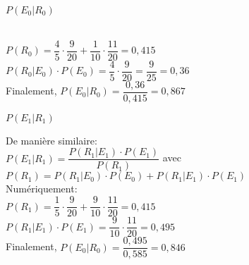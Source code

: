 \begin{exo}
\begin{subexo}{$P(E_0 | R_0)$}
\begin{flushleft}
      \\$P(R_0) = \dfrac{4}{5}\cdot\dfrac{9}{20} +\dfrac{1}{10}\cdot\dfrac{11}{20} = 0,415$
      \\$P(R_0|E_0)\cdot P(E_0) =  \dfrac{4}{5}\cdot \dfrac{9}{20} = \dfrac{9}{25} = 0,36$
      \\ Finalement, $P(E_0|R_0) = \dfrac{0,36}{0,415} = 0,867$
    \end{flushleft}
  \end{subexo}
  \begin{subexo}{$P(E_1 | R_1)$}
    \begin{flushleft}
      De manière similaire:
      \\$P(E_1|R_1) = \dfrac{P(R_1|E_1)\cdot P(E_1)}{P(R_1)}$ avec $P(R_1) = P(R_1 | E_0) \cdot P(E_0) + P(R_1 | E_1)\cdot P(E_1)$
      \\Numériquement:
      \\$P(R_1) = \dfrac{1}{5}\cdot\dfrac{9}{20} +\dfrac{9}{10}\cdot\dfrac{11}{20} = 0,415$
      \\$P(R_1|E_1)\cdot P(E_1) =  \dfrac{9}{10}\cdot \dfrac{11}{20} = 0,495$
      \\ Finalement, $P(E_0|R_0) = \dfrac{0,495}{0,585} = 0,846$
    \end{flushleft}
  \end{subexo}
\end{exo}

